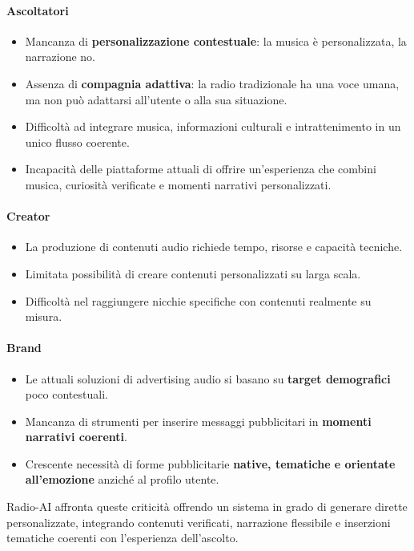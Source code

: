 \documentclass[11pt,a4paper]{article}
\begin{document}
\paragraph{Ascoltatori}
\begin{itemize}
    \item Mancanza di \textbf{personalizzazione contestuale}: la musica è personalizzata, la narrazione no.
    \item Assenza di \textbf{compagnia adattiva}: la radio tradizionale ha una voce umana, ma non può adattarsi all’utente o alla sua situazione.
    \item Difficoltà ad integrare musica, informazioni culturali e intrattenimento in un unico flusso coerente.
    \item Incapacità delle piattaforme attuali di offrire un’esperienza che combini musica, curiosità verificate e momenti narrativi personalizzati.
\end{itemize}

\paragraph{Creator}
\begin{itemize}
    \item La produzione di contenuti audio richiede tempo, risorse e capacità tecniche.
    \item Limitata possibilità di creare contenuti personalizzati su larga scala.
    \item Difficoltà nel raggiungere nicchie specifiche con contenuti realmente su misura.
\end{itemize}

\paragraph{Brand}
\begin{itemize}
    \item Le attuali soluzioni di advertising audio si basano su \textbf{target demografici} poco contestuali.
    \item Mancanza di strumenti per inserire messaggi pubblicitari in \textbf{momenti narrativi coerenti}.
    \item Crescente necessità di forme pubblicitarie \textbf{native, tematiche e orientate all’emozione} anziché al profilo utente.
\end{itemize}

Radio-AI affronta queste criticità offrendo un sistema in grado di generare dirette personalizzate, integrando contenuti verificati, narrazione flessibile e inserzioni tematiche coerenti con l’esperienza dell’ascolto.
\end{document}
